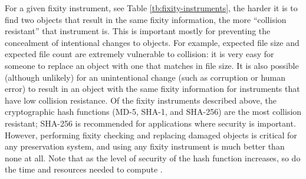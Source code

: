 \documentclass[final]{vutinfth}
\begin{document}
For a given fixity instrument, see Table \ref{tb:fixity-instruments}, the harder it is to find two objects that result in the same fixity information, the more “collision resistant” that instrument is. This is important mostly for preventing the concealment of intentional changes to objects. For example, expected file size and expected file count are extremely vulnerable to collision: it is very easy for someone to replace an object with one that matches in file size. It is also possible (although unlikely) for an unintentional change (such as corruption or human error) to result in an object with the same fixity information for instruments that have low collision resistance. Of the fixity instruments described above, the cryptographic hash functions (MD-5, SHA-1, and SHA-256) are the most collision resistant; SHA-256 is recommended for applications where security is important. However, performing fixity checking and replacing damaged objects is critical for any preservation system, and using any fixity instrument is much better than none at all. Note that as the level of security of the hash function increases, so do the time and resources needed to compute \cite[7]{ndsa2014fixity}.
\end{document}
